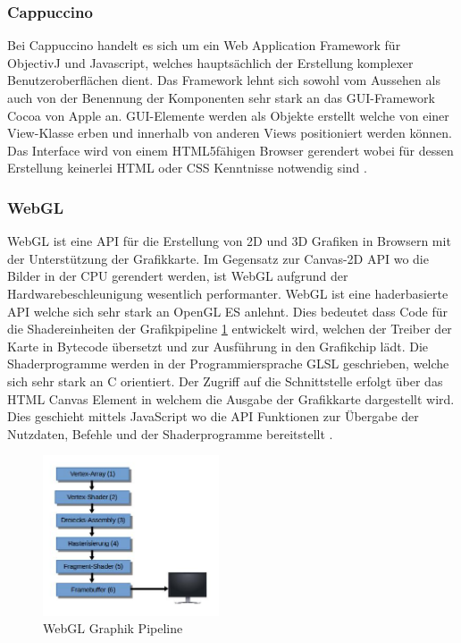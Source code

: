 \subsubsection{Cappuccino}
\label{sec:Cappuccino}
Bei Cappuccino handelt es sich um ein Web Application Framework für ObjectivJ und Javascript, welches hauptsächlich der Erstellung komplexer Benutzeroberflächen dient.
Das Framework lehnt sich sowohl vom Aussehen als auch von der Benennung der Komponenten sehr stark an das GUI-Framework Cocoa von Apple an.
GUI-Elemente werden als Objekte erstellt welche von einer View-Klasse erben und innerhalb von anderen Views positioniert werden können.
Das Interface wird von einem HTML5fähigen Browser gerendert\R{,} wobei für dessen Erstellung keinerlei HTML oder CSS Kenntnisse notwendig sind \cite{capp}.


\subsubsection{WebGL}
\label{sec:WebGL}
WebGL ist eine API für die Erstellung von 2D und 3D Grafiken in Browsern mit der Unterstützung der Grafikkarte.
Im Gegensatz zur Canvas-2D API wo die Bilder in der CPU gerendert werden, ist WebGL aufgrund der Hardwarebeschleunigung wesentlich performanter.
WebGL ist eine haderbasierte API welche sich sehr stark an OpenGL ES anlehnt.
Dies bedeutet\R{,} dass Code für die Shadereinheiten der Grafikpipeline \ref{fig:webgl_graphics_pipeline} entwickelt wird,
welchen der Treiber der Karte in Bytecode übersetzt und zur Ausführung in den Grafikchip lädt.
Die Shaderprogramme werden in der Programmiersprache GLSL geschrieben, welche sich sehr stark an C orientiert.
Der Zugriff auf die Schnittstelle erfolgt über das HTML Canvas Element in welchem die Ausgabe der Grafikkarte dargestellt wird.
Dies geschieht mittels JavaScript\R{,} wo die API Funktionen zur Übergabe der Nutzdaten, Befehle und der Shaderprogramme bereitstellt \cite{webgl-14}.
\begin{figure}[t]
	\centering
	\includegraphics[width=5.2cm]{img/graphics_pipeline.jpg}
	\caption{WebGL Graphik Pipeline}
	\label{fig:webgl_graphics_pipeline}
\end{figure}

